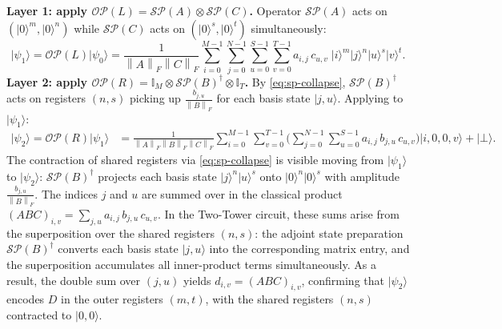 \documentclass[a4paper,UKenglish,cleveref,autoref,thm-restate]{socg-lipics-v2021}
\providecommand{\ket}[1]{\lvert #1 \rangle}
\newcommand{\norm}[1]{\left\| #1 \right\|}
\newcommand{\SP}{\mathcal{SP}}        %
\newcommand{\OP}{\mathcal{OP}}        %
\newcommand{\Id}{\mathbb{I}}         %
\begin{document}
\smallskip\noindent\textbf{Layer 1: apply $\OP(L) = \SP(A) \otimes \SP(C)$.}
Operator $\SP(A)$ acts on $(\ket{0}^{m}, \ket{0}^{n})$ while
$\SP(C)$ acts on $(\ket{0}^{s}, \ket{0}^{t})$ simultaneously:
\begin{equation*}\label{eq:psi1-3}
  \ket{\psi_1}= \OP(L)\ket{\psi_0}
  = \frac{1}{\norm{A}_F\norm{C}_F}
    \sum_{i=0}^{M-1}\sum_{j=0}^{N-1}\sum_{u=0}^{S-1}\sum_{v=0}^{T-1}
    a_{i,j}\, c_{u,v}\;\ket{i}^{m}\ket{j}^{n}\ket{u}^{s}\ket{v}^{t}.
\end{equation*}
\smallskip\noindent\textbf{Layer 2: apply $\OP(R) = \Id_M \otimes \SP(B)^\dagger \otimes \Id_T$.}
By \cref{eq:sp-collapse}, $\SP(B)^\dagger$ acts on registers $(n,s)$
picking up $\frac{b_{j, u}}{\norm{B}_F}$ for each basis state $\ket{j,u}$.
Applying to $\ket{\psi_1}$:
\begin{align*}
  \ket{\psi_2}=\OP(R)\ket{\psi_1}
  &= \frac{1}{\norm{A}_F\norm{B}_F\norm{C}_F}
     \sum_{i=0}^{M-1}\sum_{v=0}^{T-1}
     \Biggl(\sum_{j=0}^{N-1}\sum_{u=0}^{S-1}
       a_{i,j}\, b_{j,u}\, c_{u,v}
     \Biggr)\ket{i,0,0,v}
     + \ket{\bot}. \label{eq:OPR-psi1}
\end{align*}
The contraction of shared registers via \cref{eq:sp-collapse} is visible moving from
$\ket{\psi_1}$ to $\ket{\psi_2}$: $\SP(B)^\dagger$ projects each
basis state $\ket{j}^n\ket{u}^s$ onto $\ket{0}^n\ket{0}^s$ with
amplitude $\frac{b_{j,u}}{\norm{B}_F}$.
The indices $j$ and $u$ are summed over in the classical product
$(ABC)_{i, v} = \sum_{j,u} a_{i,j}\,b_{j,u}\,c_{u,v}$.
In the Two-Tower circuit, these sums arise from the superposition
over the shared registers $(n,s)$: the adjoint state preparation
$\SP(B)^\dagger$ converts each basis state $\ket{j,u}$ into the
corresponding matrix entry, and the superposition accumulates all
inner-product terms simultaneously.
As a result, the double sum over $(j,u)$ yields
$d_{i,v} = (ABC)_{i,v}$, confirming that $\ket{\psi_2}$ encodes $D$
in the outer registers $(m,t)$, with the shared registers $(n,s)$
contracted to $\ket{0,0}$.
\end{document}
